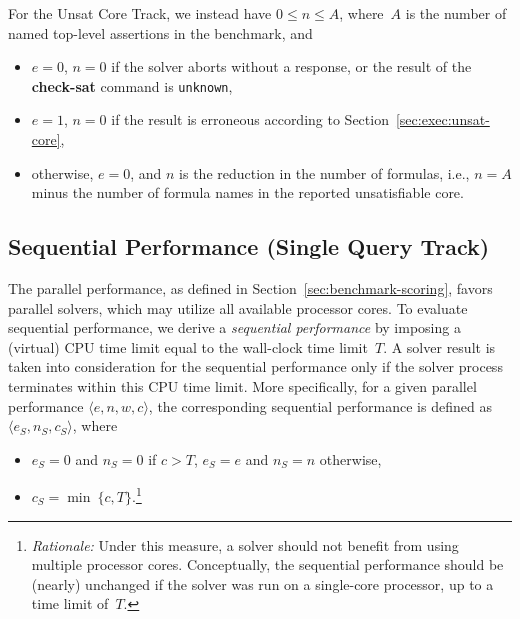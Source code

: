 \documentclass[12pt]{article}
\newcommand{\akey}[1]{\textbf{#1}}
\newcommand{\main}{Single Query\xspace}
\newcommand{\ucore}{Unsat Core\xspace}
\begin{document}
\header{\ucore Track.}
%
For the \ucore Track, we instead have $0 \leq n \leq A$, where~$A$
is the number of named top-level assertions in the benchmark, and
\begin{itemize}
\item $e=0$, $n=0$ if the solver aborts without a response, or the
  result of the \akey{check-sat} command is \texttt{unknown},
\item $e=1$, $n=0$ if the result is erroneous according to
  Section~\ref{sec:exec:unsat-core},
\item otherwise, $e=0$, and $n$ is the reduction in the number of
  formulas, i.e., $n = A$ minus the number of formula names in the
  reported unsatisfiable core.
\end{itemize}

\subsection{Sequential Performance (\main Track)}
\label{sec:sequential}


\iffalse
SMT-COMP has traditionally emphasized sequential performance (i.e.,
CPU time) over parallel performance (i.e., wall-clock time).  StarExec
measures both, and we intend to recognize both best sequential and
best parallel solvers in all competitive \main Track divisions.
\fi

The parallel performance, as defined in Section~\ref{sec:benchmark-scoring},
favors parallel solvers, which may utilize all available processor
cores.  To evaluate sequential performance, we derive a
\emph{sequential performance} by imposing a (virtual) CPU time limit equal
to the wall-clock time limit~$T$.  A solver result is taken into
consideration for the sequential performance only if the solver process
terminates within this CPU time limit.  More specifically, for a given
parallel performance $\langle e, n, w, c\rangle$, the corresponding sequential
performance is defined as~$\langle e_S, n_S, c_S\rangle$, where
\begin{itemize}
\item $e_S = 0$ and $n_S = 0$ if $c > T$, $e_S = e$ and $n_S = n$
  otherwise,
\item $c_S = \min\ \{c, T\}$.\footnote{\emph{Rationale:} Under this
  measure, a solver should not benefit from using multiple processor
  cores.  Conceptually, the sequential performance should be (nearly)
  unchanged if the solver was run on a single-core processor, up to a
  time limit of~$T$.}
\end{itemize}
\end{document}
